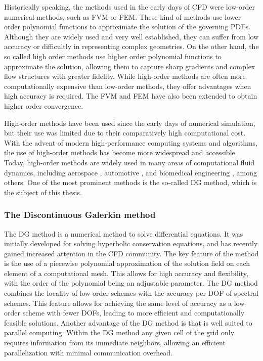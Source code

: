 Historically speaking, the methods used in the early days of CFD were low-order numerical methods, such as \gls{FVM} or \gls{FEM}. These kind of methods use lower order polynomial functions to approximate the solution of the governing \glspl{PDE}. Although they are widely used and very well established, they can suffer from  low accuracy or difficultly in representing complex geometries. On the other hand, the so called high order methods use higher order polynomial functions to approximate the solution, allowing them to capture sharp gradients and complex flow structures with greater fidelity. While high-order methods are often more computationally expensive than low-order methods, they offer advantages when high accuracy is required. The \Gls{FVM} and \Gls{FEM} have also been extended to obtain higher order convergence.

High-order methods have been used since the early days of numerical simulation, but their use was limited due to their comparatively high computational cost. With the advent of modern high-performance computing systems and algorithms, the use of high-order methods has become more widespread and accessible. Today, high-order methods are widely used in many areas of computational fluid dynamics, including aerospace \parencite{mavriplisProgessHighOrderDiscontinuous2009}, automotive \parencite{colomboAssessmentDiscontinuousGalerkin2021}, and biomedical engineering \parencite{fehnModernDiscontinuousGalerkin2019}, among others. One of the most prominent methods is the so-called \gls{DG} method, which is the subject of this thesis.

\subsubsection{The Discontinuous Galerkin method}
The \gls{DG} method is a numerical method to solve differential equations. It was initially developed for solving hyperbolic conservation equations, and has recently gained increased attention in the \gls{CFD} community. The key feature of the method is the use of a piecewise polynomial approximation of the solution field on each element of a computational mesh. This allows for high accuracy and flexibility, with the order of the polynomial being an adjustable parameter. 
The DG method combines the locality of low-order schemes with the accuracy per \gls{DOF} of spectral schemes. This feature allows for achieving the same level of accuracy as a low-order scheme with fewer \glspl{DOF}, leading to more efficient and computationally feasible solutions.  Another advantage of the  DG method is that is well suited to parallel computing. Within the DG method any given cell of the grid only requires information from its immediate neighbors, allowing an efficient parallelization with minimal communication overhead.

